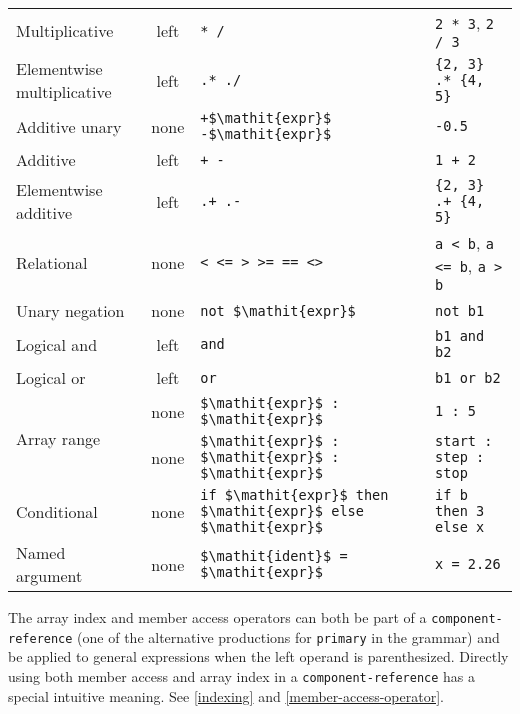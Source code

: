 \begin{table}[H]
\begin{center}
\begin{tabular}{l c l l}
\hline
Multiplicative & left & {\lstinline!* /!} & {\lstinline!2 * 3!}, {\lstinline!2 / 3!}\\
Elementwise multiplicative & left & {\lstinline!.* ./!} & {\lstinline!{2, 3} .* {4, 5}!}\\
\hline
Additive unary & none & {\lstinline!+$\mathit{expr}$ -$\mathit{expr}$!} & {\lstinline!-0.5!}\\
\hline
Additive & left & {\lstinline!+ -!} & {\lstinline!1 + 2!}\\
Elementwise additive & left & {\lstinline!.+ .-!} & {\lstinline!{2, 3} .+ {4, 5}!}\\
\hline
Relational & none & {\lstinline!< <= > >= == <>!} & {\lstinline!a < b!}, {\lstinline!a <= b!}, {\lstinline!a > b!}\\
\hline
Unary negation & none & {\lstinline!not $\mathit{expr}$!} & {\lstinline!not b1!}\\
\hline
Logical and & left & {\lstinline!and!} & {\lstinline!b1 and b2!}\\
\hline
Logical or & left & {\lstinline!or!} & {\lstinline!b1 or b2!}\\
\hline
\multirow{2}{*}{Array range} & none & {\lstinline!$\mathit{expr}$ : $\mathit{expr}$!} & {\lstinline!1 : 5!}\\
                             & none & {\lstinline!$\mathit{expr}$ : $\mathit{expr}$ : $\mathit{expr}$!} & {\lstinline!start : step : stop!}\\
\hline
Conditional & none & {\lstinline!if $\mathit{expr}$ then $\mathit{expr}$ else $\mathit{expr}$!} & {\lstinline!if b then 3 else x!}\\
\hline
Named argument & none & {\lstinline!$\mathit{ident}$ = $\mathit{expr}$!} & {\lstinline!x = 2.26!}\\
\hline
\end{tabular}
\end{center}
\end{table}

The array index and member access operators can both be part of a \lstinline[language=grammar]!component-reference! (one of the alternative productions for \lstinline[language=grammar]!primary! in the grammar) and be applied to general expressions when the left operand is parenthesized.
Directly using both member access and array index in a \lstinline[language=grammar]!component-reference! has a special intuitive meaning.
See \cref{indexing} and \cref{member-access-operator}.

